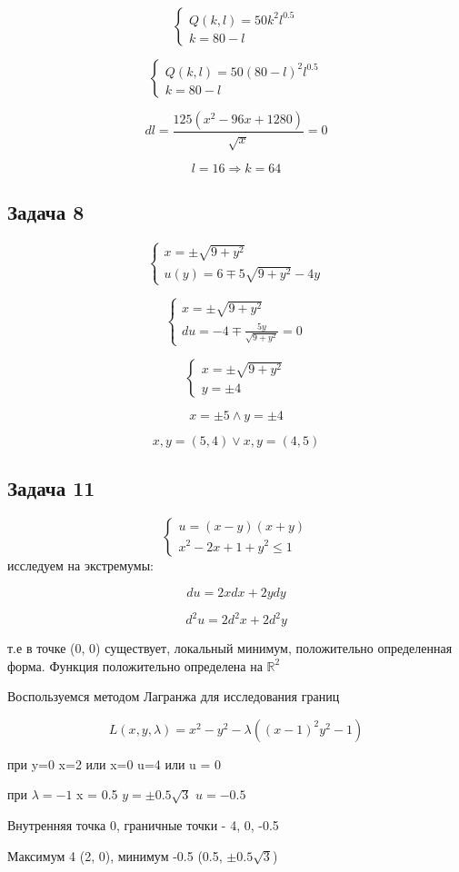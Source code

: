 \documentclass[a4paper,12pt]{article}
\begin{document}
\[
\begin{cases}
	Q(k, l) = 50k^2l^{0.5} \\
	k=80-l
\end{cases}
\]

\[
	\begin{cases}
		Q(k, l) = 50(80-l)^2l^{0.5}\\
		k=80-l
	\end{cases}
\]

\[
dl = \frac{125(x^2-96x+1280)}{\sqrt{x}} = 0
\]

\[
l = 16 \Rightarrow k = 64
\]

\subsection{Задача 8}

\[
\begin{cases}
	x = \pm\sqrt{9+y^2} \\
	u(y) = 6 \mp 5\sqrt{9+y^2} - 4y
\end{cases}
\]

\[
	\begin{cases}
		x = \pm\sqrt{9+y^2} \\
		du = -4 \mp \frac{5y}{\sqrt{9+y^2}} = 0
	\end{cases}
\]

\[
\begin{cases}
	x = \pm \sqrt{9+y^2} \\
	y = \pm 4
\end{cases}
\]

\[
x = \pm 5 \land y = \pm 4
\]

\[
x, y = (5, 4) \lor x, y = (4, 5)
\]

\subsection{Задача 11}
\[
\begin{cases}
	u=(x-y)(x+y) \\
	x^2-2x+1+y^2\le 1
\end{cases}
\]
исследуем на экстремумы:

\[
du = 2xdx+2ydy
\]

\[
d^2u = 2d^2x+2d^2y
\]

т.е в точке (0, 0) существует, локальный минимум, положительно определенная форма. Функция положительно определена на $\mathbb{R}^2$


Воспользуемся методом Лагранжа для исследования границ

\[
L(x, y, \lambda) = x^2-y^2-\lambda((x-1)^2y^2-1)
\]

при y=0 x=2 или x=0 u=4 или u = 0

при $\lambda = -1$ x = 0.5 $y = \pm 0.5\sqrt{3}$ $u=-0.5$

Внутренняя точка 0, граничные точки - 4, 0, -0.5

Максимум 4 (2, 0), минимум -0.5 (0.5, $\pm 0.5\sqrt{3}$)
\end{document}
